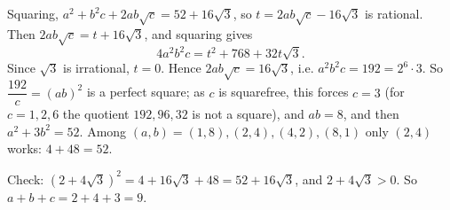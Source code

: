 Squaring, $a^2+b^2c+2ab\sqrt c=52+16\sqrt3$, so $t=2ab\sqrt c-16\sqrt3$ is rational. Then $2ab\sqrt c=t+16\sqrt3$, and squaring gives
\[4a^2b^2c=t^2+768+32t\sqrt3.\]
Since $\sqrt3$ is irrational, $t=0$. Hence $2ab\sqrt c=16\sqrt3$, i.e. $a^2b^2c=192=2^6\cdot3$. So $\dfrac{192}{c}=(ab)^2$ is a perfect square; as $c$ is squarefree, this forces $c=3$ (for $c=1,2,6$ the quotient $192,96,32$ is not a square), and $ab=8$, and then $a^2+3b^2=52$. Among $(a,b)=(1,8),(2,4),(4,2),(8,1)$ only $(2,4)$ works: $4+48=52$.

Check: $\left(2+4\sqrt3\right)^2=4+16\sqrt3+48=52+16\sqrt3$, and $2+4\sqrt3>0$. So $a+b+c=2+4+3=\boxed{9}$.
